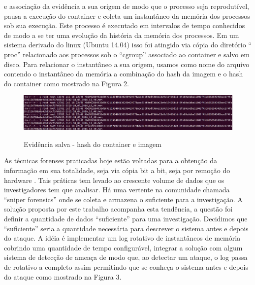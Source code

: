 \documentclass[
	12pt,				%
	openright,			%
	oneside,			%
	a4paper,			%
	english,			%
	brazil,				%
	]{abntex2}
\begin{document}
e associação da evidência a sua origem de modo que o processo seja reprodutível, pausa a execução
do container e coleta um instantâneo da memória dos processos sob sua execução. Este processo é executado em intervalos de tempo conhecidos de modo a se ter uma
evolução da história da memória dos processos. Em um sistema derivado do linux (Ubuntu 14.04) isso foi atingido via cópia do diretório ``\\proc'' relacionado 
aos processos sob o ``cgroup'' associado ao container e salvo em disco. Para relacionar o instantâneo a sua origem, usamos como nome do arquivo contendo o instantâneo 
da memória a combinação do hash da imagem e o hash do container como mostrado na Figura 2.

\begin{figure}[h!]
\caption{Evidência salva - hash do container e imagem}
\includegraphics[scale=0.3]{snapshot.jpg}
\centering
\label{fig:instantaneo}
\end{figure}

As técnicas forenses praticadas hoje estão voltadas para a obtenção da informação em sua totalidade, seja via cópia bit a bit, seja por remoção do hardware \cite{Simou2014}
\cite{Bem2008}. Tais práticas tem levado ao crescente volume de dados que os investigadores tem que analisar. Há uma vertente na comunidade chamada ``sniper 
forensics'' onde se coleta e armazena o suficiente para a investigação. A solução proposta por este trabalho acompanha esta tendência, a questão foi definir a quantidade 
de dados ``suficiente'' para uma investigação. Decidimos que ``suficiente'' seria a quantidade necessária para descrever o sistema antes e depois do ataque. A idéia é 
implementar um log rotativo de instantâneos de memória cobrindo uma quantidade de tempo configurável, integrar a solução com algum sistema de detecção de ameaça de modo
que, ao detectar um ataque, o log passa de rotativo a completo assim permitindo que se conheça o sistema antes e depois do ataque como mostrado na Figura 3. 
\end{document}
